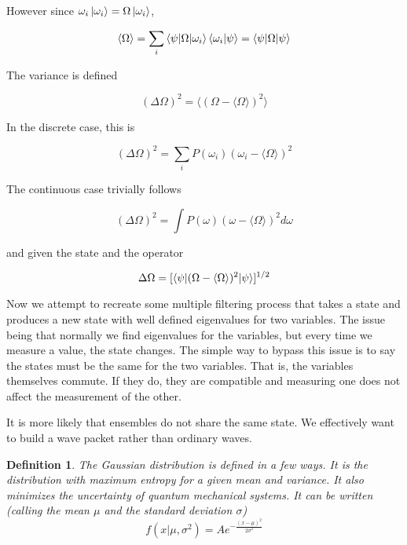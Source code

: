 \documentclass{tufte-book}
\newtheorem{definition}{Definition}
\begin{document}
However since $\omega_i\ket{\omega_i} = \Omega\ket{\omega_i}$,

\begin{equation}
	\label{eq:33}
	\langle\Omega\rangle = \sum_i\braket{\psi|\Omega|\omega_i}\braket{\omega_i|\psi} = \braket{\psi|\Omega|\psi}
\end{equation}

The variance is defined

\begin{equation}
	\label{eq:34}
	(\Delta\Omega)^2 = \langle(\Omega-\langle\Omega\rangle)^2\rangle
\end{equation}

In the discrete case, this is

\begin{equation}
	\label{eq:35}
	(\Delta\Omega)^2 = \sum_iP(\omega_i)(\omega_i-\langle\Omega\rangle)^2
\end{equation}

The continuous case trivially follows

\begin{equation}
	\label{eq:36}
	(\Delta\Omega)^2 = \int P(\omega)(\omega-\langle\Omega\rangle)^2d\omega
\end{equation}

and given the state and the operator

\begin{equation}
	\label{eq:37}
	\Delta\Omega = [\braket{\psi|(\Omega - \langle\Omega\rangle)^2|\psi}]^{1/2}
\end{equation}

Now we attempt to recreate some multiple filtering process that takes a state and produces a new state with well defined eigenvalues for two variables. The issue being that normally we find eigenvalues for the variables, but every time we measure a value, the state changes. The simple way to bypass this issue is to say the states must be the same for the two variables. That is, the variables themselves commute. If they do, they are compatible and measuring one does not affect the measurement of the other.

It is more likely that ensembles do not share the same state. We effectively want to build a wave packet rather than ordinary waves.

\begin{definition}
	\label{def:21}
	The Gaussian distribution is defined in a few ways. It is the distribution with maximum entropy for a given mean and variance. It also minimizes the uncertainty of quantum mechanical systems. It can be written (calling the mean $\mu$ and the standard deviation $\sigma$)
	\[
		f(x|\mu,\sigma^2)	= Ae^{-\frac{(x-\mu)^2}{2\sigma^2}}
	\]
\end{definition}
\end{document}
